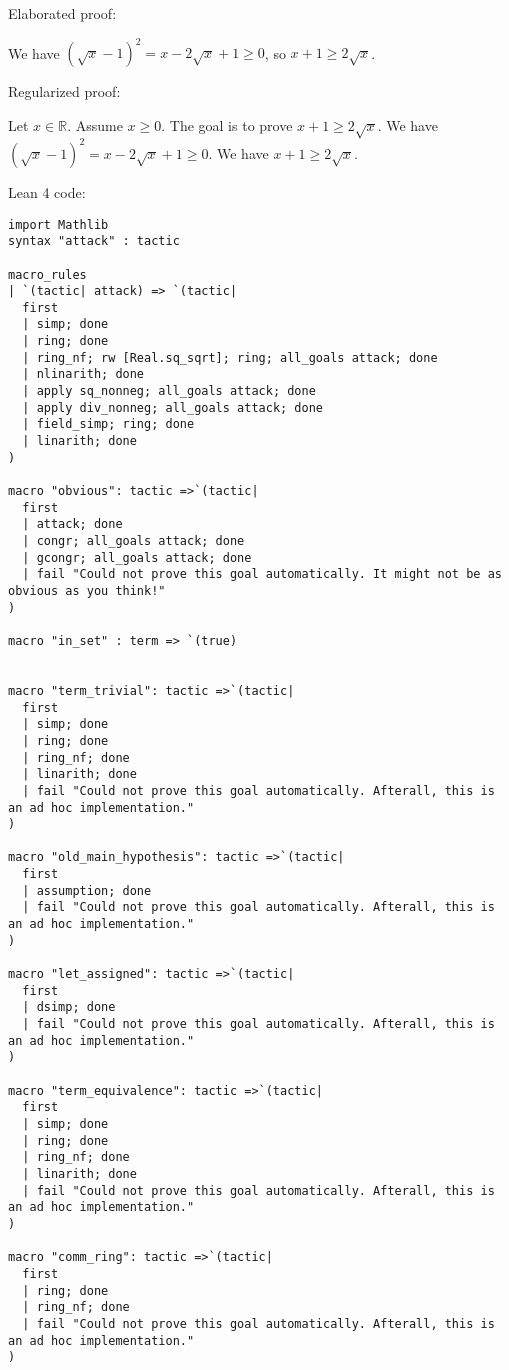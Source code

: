 \documentclass{article}
\begin{document}
Elaborated proof:
\begin{tcolorbox}[colback=green!10, width=\linewidth]
We have $(\sqrt{x}-1)^2 = x - 2\sqrt{x} + 1 \ge 0$, so $x+1 \ge 2\sqrt{x}$.
\end{tcolorbox}

Regularized proof:
\begin{tcolorbox}[colback=red!10, width=\linewidth]
Let $x\in\mathbb{R}$.
Assume $x\ge 0$.
The goal is to prove $x+1 \ge 2\sqrt{x}$.
We have ${(\sqrt{x}-1)}^2 = x - 2\sqrt{x} + 1 \ge 0$.
We have $x+1 \ge 2\sqrt{x}$.
\end{tcolorbox}

Lean 4 code:
\begin{tcolorbox}[colback=white!10, width=\linewidth]
\begin{lstlisting}[language=Lean4]
import Mathlib
syntax "attack" : tactic

macro_rules
| `(tactic| attack) => `(tactic|
  first
  | simp; done
  | ring; done
  | ring_nf; rw [Real.sq_sqrt]; ring; all_goals attack; done
  | nlinarith; done
  | apply sq_nonneg; all_goals attack; done
  | apply div_nonneg; all_goals attack; done
  | field_simp; ring; done
  | linarith; done
)

macro "obvious": tactic =>`(tactic|
  first
  | attack; done
  | congr; all_goals attack; done
  | gcongr; all_goals attack; done
  | fail "Could not prove this goal automatically. It might not be as obvious as you think!"
)

macro "in_set" : term => `(true)


macro "term_trivial": tactic =>`(tactic|
  first
  | simp; done
  | ring; done
  | ring_nf; done
  | linarith; done
  | fail "Could not prove this goal automatically. Afterall, this is an ad hoc implementation."
)

macro "old_main_hypothesis": tactic =>`(tactic|
  first
  | assumption; done
  | fail "Could not prove this goal automatically. Afterall, this is an ad hoc implementation."
)

macro "let_assigned": tactic =>`(tactic|
  first
  | dsimp; done
  | fail "Could not prove this goal automatically. Afterall, this is an ad hoc implementation."
)

macro "term_equivalence": tactic =>`(tactic|
  first
  | simp; done
  | ring; done
  | ring_nf; done
  | linarith; done
  | fail "Could not prove this goal automatically. Afterall, this is an ad hoc implementation."
)

macro "comm_ring": tactic =>`(tactic|
  first
  | ring; done
  | ring_nf; done
  | fail "Could not prove this goal automatically. Afterall, this is an ad hoc implementation."
)


\end{lstlisting}
\end{tcolorbox}
\end{document}
